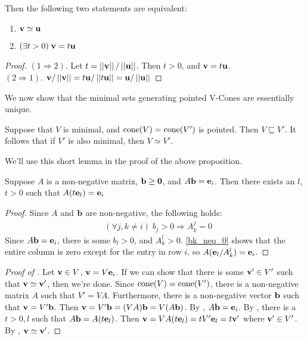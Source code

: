 \begin{Prop}\label{vector_equivalence}
	Then the following two statements are equivalent:
	\begin{enumerate}
		\item $\mathbf{v}\simeq\mathbf{u}$
		\item $(\exists t>0)\;\mathbf{v}=t\mathbf{u}$
	\end{enumerate}
\end{Prop}

\begin{proof}
	$(1\Rightarrow 2)$.  Let $t=\left|\left|\mathbf{v}\right|\right|/\left|\left|\mathbf{u}\right|\right|$.  Then $t>0$, and $\mathbf{v}=t\mathbf{u}$.\\
	$(2\Rightarrow 1)$.  $\mathbf{v}/\left|\left|\mathbf{v}\right|\right| = t\mathbf{u}/\left|\left|t\mathbf{u}\right|\right| = \mathbf{u}/\left|\left|\mathbf{u}\right|\right|$
\end{proof}

We now show that the minimal sets generating pointed V-Cones are essentially unique.

\begin{Prop}\label{min_pointed_generators}
	Suppose that $V$ is minimal, and $\operatorname{cone}(V) = \operatorname{cone}(V')$ is pointed.  Then $V\sqsubseteq V'$.  It follows that if $V'$ is also minimal, then $V\simeq V'$.
\end{Prop}

We'll use this short lemma in the proof of the above proposition.

\begin{Lemma}\label{non_negative_sums_to_e}
	Suppose $A$ is a non-negative matrix, $\mathbf{b}\geq\mathbf{0}$, and $A\mathbf{b} = \mathbf{e}_i$.  Then there exists an $l$, $t>0$ such that $A(t\mathbf{e}_l) = \mathbf{e}_i$
\end{Lemma}

\begin{proof}
	Since $A$ and $\mathbf{b}$ are non-negative, the following holds:
	\begin{align}
		 & (\forall j,k\neq i)\; b_j   > 0 \Rightarrow A_k^j = 0 \label{bk_neq_0}
	\end{align}
	Since $A\mathbf{b}=\mathbf{e}_i$, there is some $b_l > 0$, and $A_k^l > 0$.  \eqref{bk_neq_0} shows that the entire column is zero except for the entry in row $i$, so $A(\mathbf{e}_l/A_k^l) = \mathbf{e}_i$.
\end{proof}

\begin{proof}[Proof of ]
	Let $\mathbf{v}\in V$, $\mathbf{v}=V\mathbf{e}_i$.  If we can show that there is some $\mathbf{v}'\in V'$ such that $\mathbf{v}\simeq\mathbf{v}'$, then we're done.  Since $\operatorname{cone}(V)=\operatorname{cone}(V')$, there is a non-negative matrix $A$ such that $V'=VA$.  Furthermore, there is a non-negative vector $\mathbf{b}$ such that $\mathbf{v}=V'\mathbf{b}$.  Then $\mathbf{v}=V'\mathbf{b}=(VA)\mathbf{b}=V(A\mathbf{b})$.  By , $A\mathbf{b}=\mathbf{e}_i$.  By , there is a $t>0,l$ such that $A\mathbf{b}=A(t\mathbf{e}_l)$.  Then $\mathbf{v}=VA(t\mathbf{e}_l)=tV'\mathbf{e}_l=t\mathbf{v}'$ where $\mathbf{v}'\in V'$.  By , $\mathbf{v}\simeq\mathbf{v}'$.
\end{proof}

